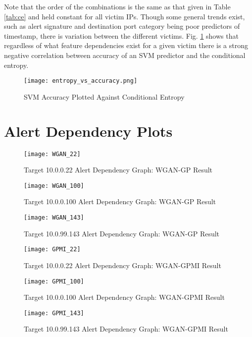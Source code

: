 \begin{appendices}
	Note that the order of the combinations is the same as that given in Table \ref{tab:ce} and held constant for all victim IPs. Though some general trends exist, such as alert signature and destination port category being poor predictors of timestamp, there is variation between the different victims. Fig. \ref{fig:entropy_v_accuracy} shows that regardless of what feature dependencies exist for a given victim there is a strong negative correlation between accuracy of an SVM predictor and the conditional entropy.
	
	\begin{figure}[!htbp]
		\centering
		\texttt{[image: entropy\_vs\_accuracy.png]}
		\caption{SVM Accuracy Plotted Against Conditional Entropy}
		\label{fig:entropy_v_accuracy}
	\end{figure}
	
	
\chapter{Alert Dependency Plots}
	\label{sec:depend_app}
	
	\begin{figure}[!htbp]
		\centering
		\texttt{[image: WGAN\_22]}
		\caption{
			Target 10.0.0.22 Alert Dependency Graph: WGAN-GP Result
		}
		\label{fig:alert_depend_2}
	\end{figure}
	
	\begin{figure}[!htbp]
		\centering
		\texttt{[image: WGAN\_100]}
		\caption{
			Target 10.0.0.100 Alert Dependency Graph: WGAN-GP Result
		}
		\label{fig:alert_depend_3}
	\end{figure}
	
	\begin{figure}[!htbp]
		\centering
		\texttt{[image: WGAN\_143]}
		\caption{
			Target 10.0.99.143 Alert Dependency Graph: WGAN-GP Result 
		}
		\label{fig:alert_depend_4}
	\end{figure}

	\begin{figure}[!htbp]
		\centering
		\texttt{[image: GPMI\_22]}
		\caption{
			Target 10.0.0.22 Alert Dependency Graph: WGAN-GPMI Result
		}
		\label{fig:alert_depend_6}
	\end{figure}
	
	\begin{figure}[!htbp]
		\centering
		\texttt{[image: GPMI\_100]}
		\caption{
			Target 10.0.0.100 Alert Dependency Graph: WGAN-GPMI Result
		}
		\label{fig:alert_depend_7}
	\end{figure}
	
	\begin{figure}[!htbp]
		\centering
		\texttt{[image: GPMI\_143]}
		\caption{
			Target 10.0.99.143 Alert Dependency Graph: WGAN-GPMI Result 
		}
		\label{fig:alert_depend_8}
	\end{figure}

\end{appendices}